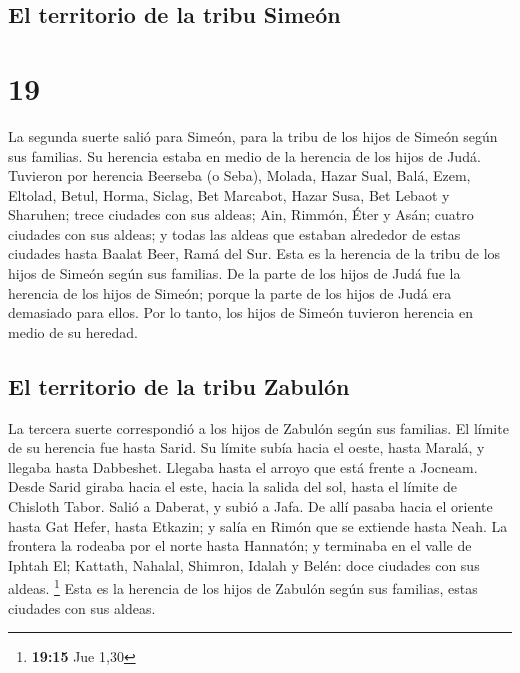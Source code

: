 \hypertarget{el-territorio-de-la-tribu-simeuxf3n}{%
\subsection{El territorio de la tribu
Simeón}\label{el-territorio-de-la-tribu-simeuxf3n}}

\hypertarget{section-18}{%
\section{19}\label{section-18}}

 La segunda suerte salió para Simeón, para la tribu de los
hijos de Simeón según sus familias. Su herencia estaba en medio de la
herencia de los hijos de Judá.  Tuvieron por herencia
Beerseba (o Seba), Molada,  Hazar Sual, Balá, Ezem,
 Eltolad, Betul, Horma,  Siclag, Bet
Marcabot, Hazar Susa,  Bet Lebaot y Sharuhen; trece
ciudades con sus aldeas;  Ain, Rimmón, Éter y Asán; cuatro
ciudades con sus aldeas;  y todas las aldeas que estaban
alrededor de estas ciudades hasta Baalat Beer, Ramá del Sur. Esta es la
herencia de la tribu de los hijos de Simeón según sus familias.
 De la parte de los hijos de Judá fue la herencia de los
hijos de Simeón; porque la parte de los hijos de Judá era demasiado para
ellos. Por lo tanto, los hijos de Simeón tuvieron herencia en medio de
su heredad.

\hypertarget{el-territorio-de-la-tribu-zabuluxf3n}{%
\subsection{El territorio de la tribu
Zabulón}\label{el-territorio-de-la-tribu-zabuluxf3n}}

 La tercera suerte correspondió a los hijos de Zabulón
según sus familias. El límite de su herencia fue hasta Sarid.
 Su límite subía hacia el oeste, hasta Maralá, y llegaba
hasta Dabbeshet. Llegaba hasta el arroyo que está frente a Jocneam.
 Desde Sarid giraba hacia el este, hacia la salida del
sol, hasta el límite de Chisloth Tabor. Salió a Daberat, y subió a Jafa.
 De allí pasaba hacia el oriente hasta Gat Hefer, hasta
Etkazin; y salía en Rimón que se extiende hasta Neah.  La
frontera la rodeaba por el norte hasta Hannatón; y terminaba en el valle
de Iphtah El;  Kattath, Nahalal, Shimron, Idalah y Belén:
doce ciudades con sus aldeas. \footnote{\textbf{19:15} Jue 1,30}
 Esta es la herencia de los hijos de Zabulón según sus
familias, estas ciudades con sus aldeas.

